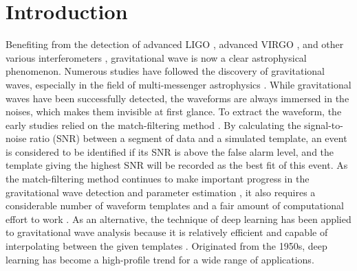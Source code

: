 \documentclass[preprint,12pt]{elsarticle}
\begin{document}


\section{Introduction}
Benefiting from the detection of advanced LIGO \cite{collaboration2015advanced}, advanced VIRGO \cite{acernese2014advanced}, and other various interferometers \cite{luck2010upgrade, kagra2019kagra, unnikrishnan2013indigo}, gravitational wave is now a clear astrophysical phenomenon. 
Numerous studies have followed the discovery of gravitational waves, especially in the field of multi-messenger astrophysics \cite{abbott2017multi, meszaros2019multi, liu2021multi, corsi2024multi}.
While gravitational waves have been successfully detected, the waveforms are always immersed in the noises, which makes them invisible at first glance. 
To extract the waveform, the early studies relied on the match-filtering method \cite{allen2012findchirp}. 
By calculating the signal-to-noise ratio (SNR) between a segment of data and a simulated template, an event is considered to be identified if its SNR is above the false alarm level, and the template giving the highest SNR will be recorded as the best fit of this event. 
As the match-filtering method continues to make important progress in the gravitational wave detection and parameter estimation \cite{abbott2019gwtc, abbott2019binary, abbott2021gwtc, abbott2021population, abbott2023gwtc, abbott2023population}, it also requires a considerable number of waveform templates and a fair amount of computational effort to work \cite{indik2018reducing, dhurkunde2022hierarchical}.
As an alternative, the technique of deep learning has been applied to gravitational wave analysis because it is relatively efficient \cite{george2018deep, murali2023detecting} and capable of interpolating between the given templates \cite{george2018paraest}. 
Originated from the 1950s, deep learning has become a high-profile trend for a wide range of applications. 
\end{document}
